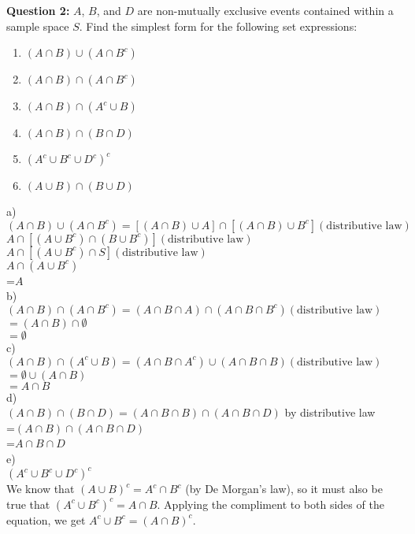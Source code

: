 \documentclass[12pt]{article}
\begin{document}
\noindent \textbf{Question 2:} $A$, $B$, and $D$ are non-mutually exclusive events contained within a sample space $S$. Find the simplest form for the following set expressions:
\begin{enumerate}
\item $(A \cap B) \cup (A \cap B^c)$
\item $(A \cap B) \cap (A \cap B^c)$
\item $(A \cap B) \cap (A^c \cup B)$
\item $(A \cap B) \cap (B \cap D)$
\item $(A^c \cup B^c \cup D^c)^c$
\item $(A \cup B) \cap (B \cup D)$
\end{enumerate}
\bigskip

a)\\
$(A \cap B) \cup (A \cap B^c) = [(A \cap B) \cup A] \cap [(A \cap B) \cup B^c] (\mbox{distributive law})$\\
$A \cap [(A \cup B^c) \cap (B \cup B^c)](\mbox{distributive law})$\\
$A \cap [(A \cup B^c) \cap S](\mbox{distributive law})$\\
$A \cap (A \cup B^c) $\\
=$A$\\

b)\\
$(A \cap B) \cap (A \cap B^c) = (A \cap B \cap A) \cap (A \cap B \cap B^c) (\mbox{distributive law})$\\
 $= (A \cap B) \cap \emptyset$\\
 $= \emptyset$\\
 
 c)\\
$(A \cap B) \cap (A^c \cup B) = (A \cap B \cap A^c) \cup (A \cap B \cap B) (\mbox{distributive law})$\\
 $= \emptyset \cup (A \cap B)$\\
 $= A \cap B$\\
 
  d)\\

$(A \cap B) \cap (B \cap D) = (A \cap B \cap B) \cap (A \cap B \cap D)$ by distributive law\\
=$(A \cap B) \cap (A \cap B \cap D) $\\
=$A \cap B  \cap D $\\



  e)\\
$(A^c \cup B^c \cup D^c)^c$ \\
We know that  $(A\cup B)^c = A^c \cap B^c$ (by De Morgan's law), so it must also be true that $(A^c \cup B^c)^c = A \cap B$. Applying the compliment to both sides of the equation, we get $A^c \cup B^c = (A \cap B)^c$.\\
\end{document}
